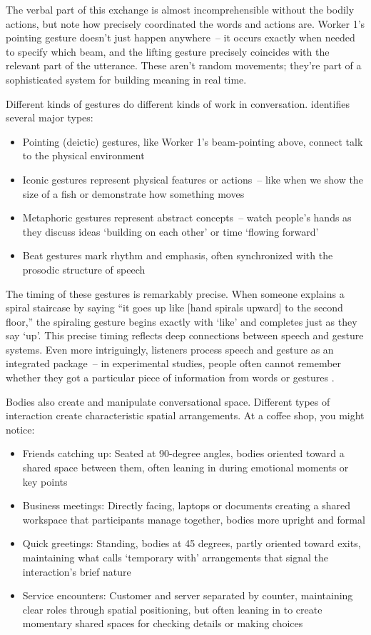 The verbal part of this exchange is almost incomprehensible without the bodily actions, but note how precisely coordinated the words and actions are. Worker 1's pointing gesture doesn't just happen anywhere~-- it occurs exactly when needed to specify which beam, and the lifting gesture precisely coincides with the relevant part of the utterance. These aren't random movements; they're part of a sophisticated system for building meaning in real time.

Different kinds of gestures do different kinds of work in conversation. \citet{mcneill1992} identifies several major types:
\begin{itemize}[noitemsep]
   \item Pointing (deictic) gestures, like Worker 1's beam-pointing above, connect talk to the physical environment
   \item Iconic gestures represent physical features or actions~-- like when we show the size of a fish or demonstrate how something moves
   \item Metaphoric gestures represent abstract concepts~-- watch people's hands as they discuss ideas `building on each other' or time `flowing forward'
   \item Beat gestures mark rhythm and emphasis, often synchronized with the prosodic structure of speech
\end{itemize}

The timing of these gestures is remarkably precise. When someone explains a spiral staircase by saying ``it goes up like [hand spirals upward] to the second floor,'' the spiraling gesture begins exactly with `like' and completes just as they say `up'. This precise timing reflects deep connections between speech and gesture systems. Even more intriguingly, listeners process speech and gesture as an integrated package~-- in experimental studies, people often cannot remember whether they got a particular piece of information from words or gestures \citep{needed}.

Bodies also create and manipulate conversational space. Different types of interaction create characteristic spatial arrangements. At a coffee shop, you might notice:
\begin{itemize}[noitemsep]
   \item Friends catching up: Seated at 90-degree angles, bodies oriented toward a shared space between them, often leaning in during emotional moments or key points
   \item Business meetings: Directly facing, laptops or documents creating a shared workspace that participants manage together, bodies more upright and formal
   \item Quick greetings: Standing, bodies at 45 degrees, partly oriented toward exits, maintaining what \citet{kendon1990} calls `temporary with' arrangements that signal the interaction's brief nature
   \item Service encounters: Customer and server separated by counter, maintaining clear roles through spatial positioning, but often leaning in to create momentary shared spaces for checking details or making choices
\end{itemize}

